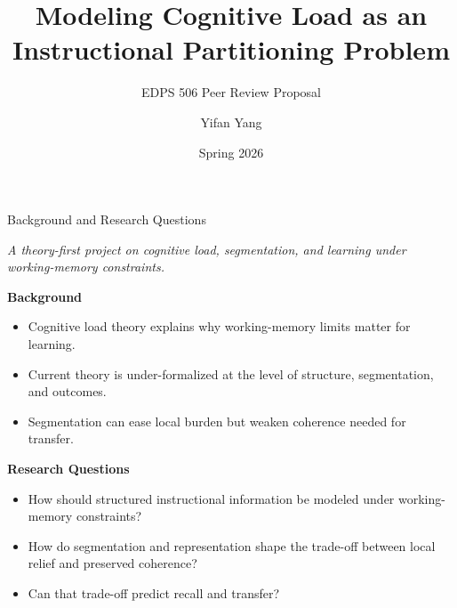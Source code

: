 \documentclass{beamer}
\title{Modeling Cognitive Load as an Instructional Partitioning Problem}
\subtitle{EDPS 506 Peer Review Proposal}
\author{Yifan Yang}
\date{Spring 2026}
\begin{document}
\small

\begin{frame}[t]{Background and Research Questions}

\textit{A theory-first project on cognitive load, segmentation, and learning under working-memory constraints.}

\vspace{0.4em}
\textbf{Background}
\begin{itemize}
\setlength{\itemsep}{0.15em}
\item Cognitive load theory explains why working-memory limits matter for learning.
\item Current theory is under-formalized at the level of structure, segmentation, and outcomes.
\item Segmentation can ease local burden but weaken coherence needed for transfer.
\end{itemize}

\vspace{0.2em}
\textbf{Research Questions}
\begin{itemize}
\setlength{\itemsep}{0.15em}
\item How should structured instructional information be modeled under working-memory constraints?
\item How do segmentation and representation shape the trade-off between local relief and preserved coherence?
\item Can that trade-off predict recall and transfer?
\end{itemize}

\end{frame}
\end{document}
